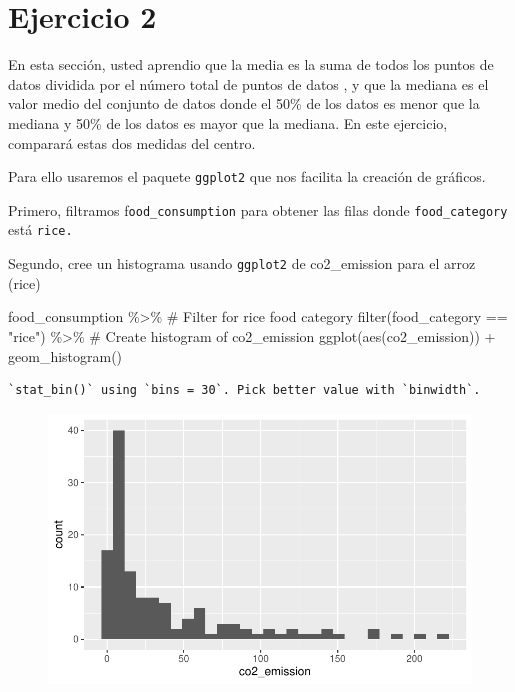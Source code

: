 \documentclass[
  letterpaper,
  DIV=11,
  numbers=noendperiod]{scrreprt}
\newenvironment{Shaded}{\begin{snugshade}}{\end{snugshade}}
\newcommand{\CommentTok}[1]{\textcolor[rgb]{0.37,0.37,0.37}{#1}}
\newcommand{\FunctionTok}[1]{\textcolor[rgb]{0.28,0.35,0.67}{#1}}
\newcommand{\NormalTok}[1]{\textcolor[rgb]{0.00,0.23,0.31}{#1}}
\newcommand{\SpecialCharTok}[1]{\textcolor[rgb]{0.37,0.37,0.37}{#1}}
\newcommand{\StringTok}[1]{\textcolor[rgb]{0.13,0.47,0.30}{#1}}
\begin{document}
\hypertarget{ejercicio-2}{%
\section{Ejercicio 2}\label{ejercicio-2}}

En esta sección, usted aprendio que la media es la suma de todos los
puntos de datos dividida por el número total de puntos de datos , y que
la mediana es el valor medio del conjunto de datos donde el 50\% de los
datos es menor que la mediana y 50\% de los datos es mayor que la
mediana. En este ejercicio, comparará estas dos medidas del centro.

Para ello usaremos el paquete \texttt{ggplot2} que nos facilita la
creación de gráficos.

Primero, filtramos f\texttt{ood\_consumption} para obtener las filas
donde \texttt{food\_category} está \texttt{rice.}

Segundo, cree un histograma usando \texttt{ggplot2} de co2\_emission
para el arroz (rice)

\begin{Shaded}
\begin{Highlighting}[]
\NormalTok{food\_consumption }\SpecialCharTok{\%\textgreater{}\%}
  \CommentTok{\# Filter for rice food category}
  \FunctionTok{filter}\NormalTok{(food\_category }\SpecialCharTok{==} \StringTok{"rice"}\NormalTok{) }\SpecialCharTok{\%\textgreater{}\%}
  \CommentTok{\# Create histogram of co2\_emission}
  \FunctionTok{ggplot}\NormalTok{(}\FunctionTok{aes}\NormalTok{(co2\_emission)) }\SpecialCharTok{+}
    \FunctionTok{geom\_histogram}\NormalTok{()}
\end{Highlighting}
\end{Shaded}

\begin{verbatim}
`stat_bin()` using `bins = 30`. Pick better value with `binwidth`.
\end{verbatim}

\begin{figure}[H]

{\centering \includegraphics{intro_files/figure-pdf/unnamed-chunk-15-1.pdf}

}

\end{figure}
\end{document}

